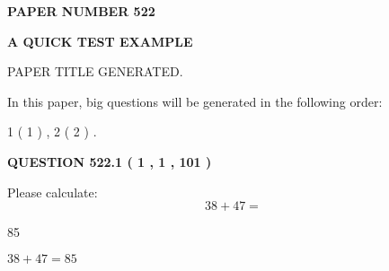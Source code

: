 \documentclass[12pt]{article}
\begin{document}
   
   
   
\newpage 
\setcounter{page}{ 
   522001 } 
   
   
   
   
 {\textbf{ \Large{ PAPER NUMBER  522  }}}
   
   
\vspace{0.2in}
   
   
   
   
   
   
   
   
 \vspace{0.2in}
{\LARGE {\textbf{ A QUICK TEST EXAMPLE}}}
   
   
 PAPER TITLE GENERATED.
   
   
   
\vspace{0.2in}
   
In this paper, big questions will be generated in the following order: 
   
   
   1 ( 1 )
 ,
   2 ( 2 )
 .
  
\vspace{0.2in}
  
{\textbf{\Large{QUESTION
522.1 
 ( 1 , 1 , 101 )
}}}
  
  
 
Please calculate:
\begin{equation}
38 +  %
47 = \nonumber
\end{equation}
 
 
 
\noindent{}
 
 

85
 
 
\noindent{}
 
 

 
 
 
\noindent{}
 
 

$ %
38 +  %
47=   %
85$
 
 
\noindent{}
 
 

 
   
\end{document}

